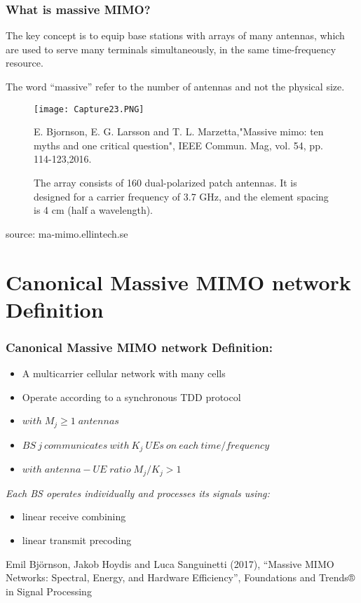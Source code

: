 \documentclass{beamer}
\begin{document}
\begin{frame}[t,fragile=singleslide]\frametitle{What is massive MIMO?}
The key concept is to equip base stations with arrays of many antennas, which are used to serve many terminals simultaneously, in the same time-frequency resource. 


The word “massive” refer to the number of antennas and not the physical size.
\begin{figure}
  \texttt{[image: Capture23.PNG]}
  \caption{\tiny The array consists of 160 dual-polarized patch antennas. It is designed for a carrier frequency of 3.7 GHz, and the element spacing is 4 cm (half a wavelength).}
\tiny E. Bjornson, E. G. Larsson and T. L. Marzetta,"Massive mimo: ten myths and one critical question", IEEE Commun. Mag, vol. 54, pp. 114-123,2016.
\end{figure}
\tiny source: ma-mimo.ellintech.se
\end{frame}

\section{Canonical Massive MIMO network Definition}

\begin{frame}[fragile=singleslide]\frametitle{Canonical Massive MIMO network Definition:}
\begin{itemize}
\item A multicarrier cellular network with many cells
\item Operate according to a synchronous TDD protocol
\item $with \; M_{j} \geq 1 \;antennas$
\item $BS \ j \ communicates \ with \ K_{j} \ UEs \ on \ each \ time/frequency$
\item $with\; antenna-UE\; ratio\; M_{j}/K_{j} > 1$
\end{itemize}
\vspace{0.75cm}
\textit{Each BS operates individually and processes its signals using:}
\begin{itemize}
\item linear receive combining
\item linear transmit precoding
\end{itemize}

\vspace{1cm}

\tiny Emil Björnson, Jakob Hoydis and Luca Sanguinetti (2017), “Massive MIMO Networks: Spectral, Energy, and Hardware Efficiency”, Foundations and Trends® in Signal Processing
\end{frame}
\end{document}
